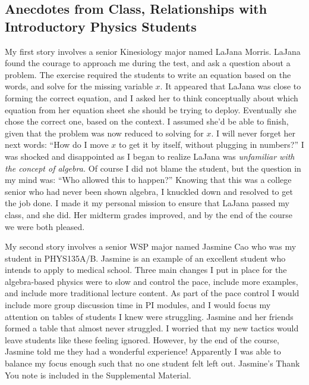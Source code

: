 \documentclass[../../main.tex]{subfiles}
\begin{document}
\subsection{Anecdotes from Class, Relationships with Introductory Physics Students}

My first story involves a senior Kinesiology major named LaJana Morris.  LaJana found the courage to approach me during the test, and ask a question about a problem.  The exercise required the students to write an equation based on the words, and solve for the missing variable $x$.  It appeared that LaJana was close to forming the correct equation, and I asked her to think conceptually about which equation from her equation sheet she should be trying to deploy.  Eventually she chose the correct one, based on the context.  I assumed she'd be able to finish, given that the problem was now reduced to solving for $x$.  I will never forget her next words: ``How do I move $x$ to get it by itself, without plugging in numbers?''  I was shocked and disappointed as I began to realize LaJana was \textit{unfamiliar with the concept of algebra.}  Of course I did not blame the student, but the question in my mind was: ``Who allowed this to happen?''  Knowing that this was a college senior who had never been shown algebra, I knuckled down and resolved to get the job done.  I made it my personal mission to ensure that LaJana passed my class, and she did.  Her midterm grades improved, and by the end of the course we were both pleased.  \\ \hspace{0.1cm}

My second story involves a senior WSP major named Jasmine Cao who was my student in PHYS135A/B.  Jasmine is an example of an excellent student who intends to apply to medical school.  Three main changes I put in place for the algebra-based physics were to slow and control the pace, include more examples, and include more traditional lecture content.  As part of the pace control I would include more group discussion time in PI modules, and I would focus my attention on tables of students I knew were struggling.  Jasmine and her friends formed a table that almost never struggled.  I worried that my new tactics would leave students like these feeling ignored.  However, by the end of the course, Jasmine told me they had a wonderful experience!  Apparently I was able to balance my focus enough such that no one student felt left out.  Jasmine's Thank You note is included in the Supplemental Material.  \\ \hspace{0.1cm}
\end{document}
